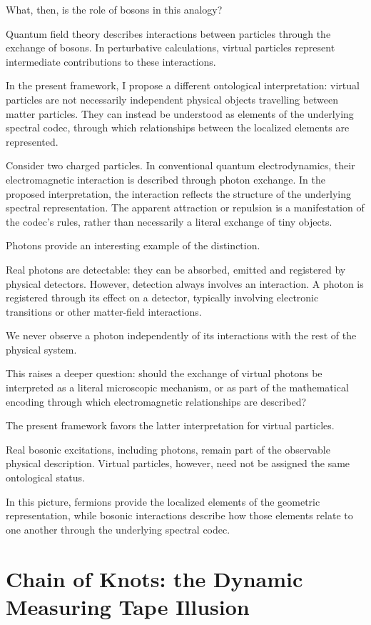What, then, is the role of bosons in this analogy?

Quantum field theory describes interactions between particles through the exchange of bosons. In perturbative calculations, virtual particles represent intermediate contributions to these interactions.

In the present framework, I propose a different ontological interpretation: virtual particles are not necessarily independent physical objects travelling between matter particles. They can instead be understood as elements of the underlying spectral codec, through which relationships between the localized elements are represented.

Consider two charged particles. In conventional quantum electrodynamics, their electromagnetic interaction is described through photon exchange. In the proposed interpretation, the interaction reflects the structure of the underlying spectral representation. The apparent attraction or repulsion is a manifestation of the codec's rules, rather than necessarily a literal exchange of tiny objects.

Photons provide an interesting example of the distinction.

Real photons are detectable: they can be absorbed, emitted and registered by physical detectors. However, detection always involves an interaction. A photon is registered through its effect on a detector, typically involving electronic transitions or other matter-field interactions.

We never observe a photon independently of its interactions with the rest of the physical system.

This raises a deeper question: should the exchange of virtual photons be interpreted as a literal microscopic mechanism, or as part of the mathematical encoding through which electromagnetic relationships are described?

The present framework favors the latter interpretation for virtual particles.

Real bosonic excitations, including photons, remain part of the observable physical description. Virtual particles, however, need not be assigned the same ontological status.

In this picture, fermions provide the localized elements of the geometric representation, while bosonic interactions describe how those elements relate to one another through the underlying spectral codec.


\section{Chain of Knots: the Dynamic Measuring Tape Illusion}

